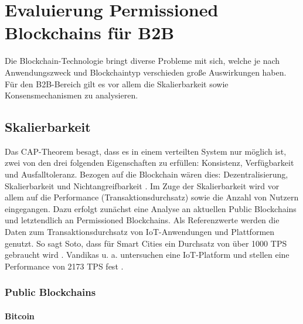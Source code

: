 \chapter{Evaluierung Permissioned Blockchains für B2B}
\label{cha:b2b-eval}

Die Blockchain-Technologie bringt diverse Probleme mit sich, welche je nach Anwendungszweck und Blockchaintyp verschieden große Auswirkungen haben. Für den B2B-Bereich gilt es vor allem die Skalierbarkeit sowie Konsensmechanismen zu analysieren.

\section{Skalierbarkeit}
\label{sec:scalability-eval}
Das CAP-Theorem besagt, dass es in einem verteilten System nur möglich ist, zwei von den drei folgenden Eigenschaften zu erfüllen: Konsistenz, Verfügbarkeit und Ausfalltoleranz. Bezogen auf die Blockchain wären dies: Dezentralisierung, Skalierbarkeit und Nichtangreifbarkeit \cite{SchererPerformanceScalabilityBlockchain2017}. Im Zuge der Skalierbarkeit wird vor allem auf die Performance (Transaktionsdurchsatz) sowie die Anzahl von Nutzern  eingegangen. Dazu erfolgt zunächst eine Analyse an aktuellen Public Blockchains und letztendlich an Permissioned Blockchains. Als Referenzwerte werden die Daten zum Transaktionsdurchsatz von IoT-Anwendungen und Plattformen genutzt. So sagt Soto, dass für Smart Cities ein Durchsatz von über 1000 \acs{TPS} gebraucht wird \cite{AraujoSotoPerformanceevaluationscalable2017}. Vandikas u. a. untersuchen eine IoT-Platform und stellen eine Performance von 2173 \acs{TPS} fest \cite{VandikasPerformanceEvaluationIoT2014a}. 

\subsection{Public Blockchains}


\subsubsection{Bitcoin}

